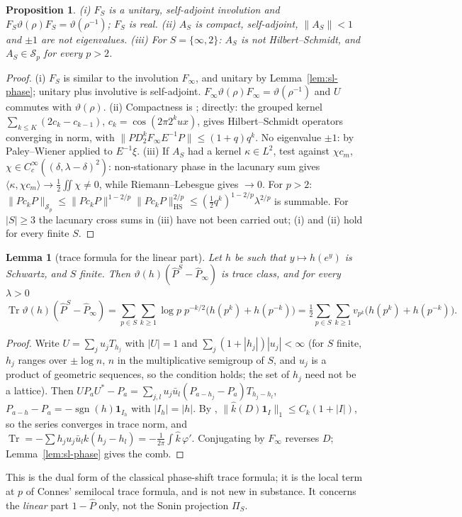 \documentclass[11pt]{amsart}
\newtheorem{proposition}[theorem]{Proposition}
\newtheorem{lemma}[theorem]{Lemma}
\theoremstyle{definition}
\theoremstyle{remark}
\begin{document}
\begin{proposition}\label{prop:sl-AS}
\emph{(i)} $F_S$ is a unitary, self-adjoint involution and $F_S\vartheta(\rho)F_S=\vartheta(\rho^{-1})$; $F_S$ is real.
\emph{(ii)} $A_S$ is compact, self-adjoint, $\|A_S\|<1$ and $\pm1$ are not eigenvalues.
\emph{(iii)} For $S=\{\infty,2\}$: $A_S$ is not Hilbert--Schmidt, and $A_S\in\mathcal S_p$ for every $p>2$.
\end{proposition}
\begin{proof}
(i) $F_S$ is similar to the involution $F_\infty$, and unitary by Lemma~\ref{lem:sl-phase}; unitary plus involutive is
self-adjoint. $F_\infty\vartheta(\rho)F_\infty=\vartheta(\rho^{-1})$ and $U$ commutes with $\vartheta(\rho)$.
(ii) Compactness is \cite[Thms.~2.1, 4.4]{CCquasi2020}; directly: the grouped kernel
$\sum_{k\le K}(2c_k-c_{k-1})$, $c_k=\cos(2\pi2^kux)$, gives Hilbert--Schmidt operators converging in norm, with
$\|PD_2^kF_\infty E^{-1}P\|\le(1+q)q^k$. No eigenvalue $\pm1$: by Paley--Wiener applied to $E^{-1}\xi$.
(iii) If $A_S$ had a kernel $\kappa\in L^2$, test against $\chi c_m$, $\chi\in C_c^\infty((\delta,\lambda-\delta)^2)$:
non-stationary phase in the lacunary sum gives $\langle\kappa,\chi c_m\rangle\to\frac12\iint\chi\ne0$, while
Riemann--Lebesgue gives $\to0$. For $p>2$:
$\|Pc_kP\|_{\mathcal S_p}\le\|Pc_kP\|^{1-2/p}\|Pc_kP\|_{\mathrm{HS}}^{2/p}\le(\tfrac12q^k)^{1-2/p}\lambda^{2/p}$ is summable.
For $|S|\ge3$ the lacunary cross sums in (iii) have not been carried out; (i) and (ii) hold for every finite $S$.
\end{proof}

\begin{lemma}[trace formula for the linear part]\label{lem:sl-linear}
Let $h$ be such that $y\mapsto h(e^y)$ is Schwartz, and $S$ finite. Then $\vartheta(h)(\widehat P^S-\widehat P_\infty)$ is
trace class, and for every $\lambda>0$
\[
\operatorname{Tr}\vartheta(h)(\widehat P^S-\widehat P_\infty)=\sum_{p\in S}\sum_{k\ge1}\log p\;p^{-k/2}\big(h(p^k)+h(p^{-k})\big)
=\tfrac12\sum_{p\in S}\sum_{k\ge1}v_{p^k}\big(h(p^k)+h(p^{-k})\big).
\]
\end{lemma}
\begin{proof}
Write $U=\sum_ju_jT_{h_j}$ with $|U|=1$ and $\sum_j(1+|h_j|)|u_j|<\infty$ (for $S$ finite, $h_j$ ranges over
$\pm\log n$, $n$ in the multiplicative semigroup of $S$, and $u_j$ is a product of geometric sequences, so the
condition holds; the set of $h_j$ need not be a lattice). Then $UP_aU^*-P_a=\sum_{j,l}u_j\bar u_l(P_{a-h_j}-P_a)T_{h_j-h_l}$,
$P_{a-h}-P_a=-\operatorname{sgn}(h)\mathbf 1_{I_h}$ with $|I_h|=|h|$. By \cite[Thm.~4.5]{Simon2005},
$\|\widehat k(D)\mathbf 1_I\|_1\le C_k(1+|I|)$, so the series converges in trace norm, and
$\operatorname{Tr}=-\sum h_ju_j\bar u_lk(h_j-h_l)=-\frac1{2\pi}\int\widehat k\,\varphi'$. Conjugating by $F_\infty$
reverses $D$; Lemma~\ref{lem:sl-phase} gives the comb.
\end{proof}
This is the dual form of the classical phase-shift trace formula; it is the local
term at $p$ of Connes' semilocal trace formula, and is not new in substance. It concerns the \emph{linear} part
$1-\widehat P$ only, not the Sonin projection $\Pi_S$.
\end{document}
